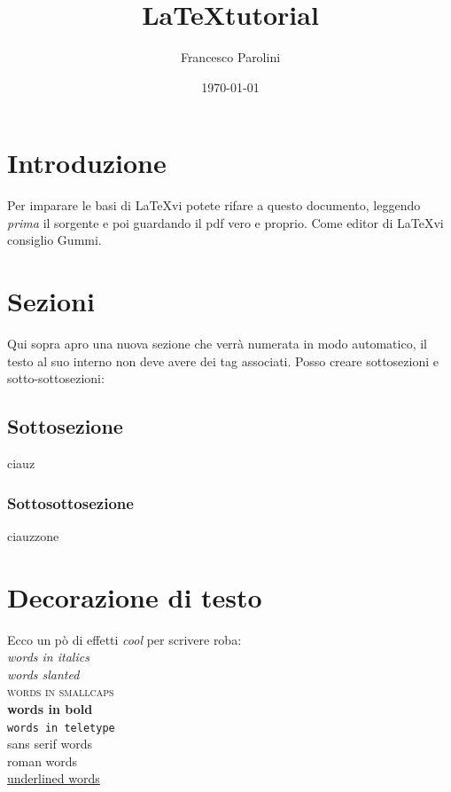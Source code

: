 \documentclass[a4paper,12pt]{article}
\begin{document}
%
\title{\LaTeX    tutorial}
\author{Francesco Parolini}
\date{\today}
\maketitle

\tableofcontents

\listoffigures

\newpage

\section{Introduzione}
Per imparare le basi di \LaTeX vi potete rifare a questo documento, leggendo \emph{prima} il sorgente e poi guardando il pdf vero e proprio. Come editor di \LaTeX vi consiglio Gummi.

\section{Sezioni}
Qui sopra apro una nuova sezione che verrà numerata in modo automatico, il testo al suo interno non deve avere dei tag associati. Posso creare sottosezioni e sotto-sottosezioni:

\subsection{Sottosezione}
ciauz

\subsubsection{Sottosottosezione}
ciauzzone

\section{Decorazione di testo}
Ecco un pò di effetti {\color{red}\textit{cool}} per scrivere roba:\\ %
	\emph{words in italics}\\
	\textsl{words slanted}\\
	\textsc{words in smallcaps}\\
	\textbf{words in bold}\\
	\texttt{words in teletype}\\
	\textsf{sans serif words}\\
	\textrm{roman words}\\
	\underline{underlined words}\\
\end{document}
